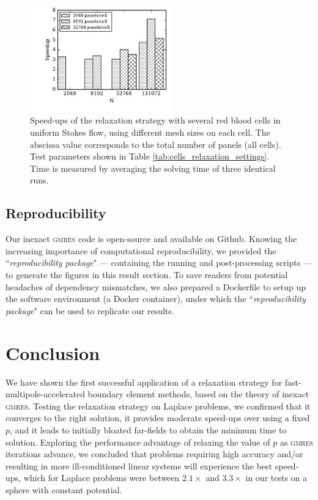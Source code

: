 \documentclass[final,3p,times]{elsarticle}
\newcommand{\gmres}{\textsc{gmres}\xspace}
\begin{document}
\begin{figure}[ht]
\begin{center}
	\includegraphics[natwidth=4in,natheight=3in,width=0.55\textwidth]{EthrocyteMultipleCellSpeedup.pdf}
	\caption{Speed-ups of the relaxation strategy with several red blood cells in uniform Stokes flow, using different mesh sizes on each cell. The abscissa value corresponds to the total number of panels (all cells). Test parameters shown in Table \ref{tab:cells_relaxation_settings}. Time is measured by averaging the solving time of three identical runs.} 
	\label{fig:multiple_cell_speedup}
\end{center}
\end{figure}

\subsection{Reproducibility}

Our inexact \gmres code is open-source and available on Github. Knowing the increasing importance of computational reproducibility, we provided the ``\textit{reproducibility package}" --- containing the running and post-processing scripts --- to generate the figures in this result section. To save readers from potential headaches of dependency mismatches, we also prepared a Dockerfile to setup up the software environment (a Docker container), under which the ``\textit{reproducibility package}" can be used to replicate our results.


\section{Conclusion} 

We have shown the first successful application of a relaxation strategy for fast-multipole-accelerated boundary element methods, based on the theory of inexact \gmres. Testing the relaxation strategy on Laplace problems, we confirmed that it converges to the right solution, it provides moderate speed-ups over using a fixed $p$, and it leads to initially bloated far-fields to obtain the minimum time to solution.
Exploring the performance advantage of relaxing the value of $p$ as \gmres iterations advance, we concluded that problems requiring high accuracy and/or resulting in more ill-conditioned linear systems will experience the best speed-ups, which for Laplace problems were between $2.1\times$ and $3.3\times$ in our tests on a sphere with constant potential.
\end{document}
